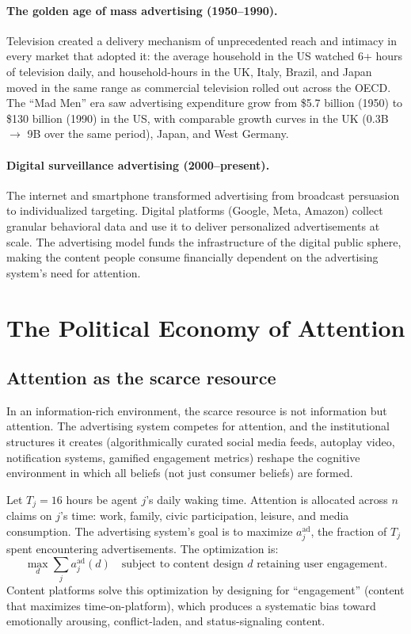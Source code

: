 \paragraph{The golden age of mass advertising (1950--1990).}
Television created a delivery mechanism of unprecedented reach and intimacy in every market that adopted it: the average household in the US watched 6+ hours of television daily, and household-hours in the UK, Italy, Brazil, and Japan moved in the same range as commercial television rolled out across the OECD.
The ``Mad Men'' era saw advertising expenditure grow from \$5.7 billion (1950) to \$130 billion (1990) in the US, with comparable growth curves in the UK (\textsterling 0.3B \(\to\) \textsterling 9B over the same period), Japan, and West Germany.

\paragraph{Digital surveillance advertising (2000--present).}
The internet and smartphone transformed advertising from broadcast persuasion to individualized targeting.
Digital platforms (Google, Meta, Amazon) collect granular behavioral data and use it to deliver personalized advertisements at scale.
The advertising model funds the infrastructure of the digital public sphere, making the content people consume financially dependent on the advertising system's need for attention.

\section{The Political Economy of Attention}
\label{sec:ch23-attention}

\subsection{Attention as the scarce resource}

In an information-rich environment, the scarce resource is not information but attention.
The advertising system competes for attention, and the institutional structures it creates (algorithmically curated social media feeds, autoplay video, notification systems, gamified engagement metrics) reshape the cognitive environment in which all beliefs (not just consumer beliefs) are formed.

\begin{model}
\label{mod:attention}
Let $T_j = 16$ hours be agent $j$'s daily waking time.
Attention is allocated across $n$ claims on $j$'s time: work, family, civic participation, leisure, and media consumption.
The advertising system's goal is to maximize $a_j^{\text{ad}}$, the fraction of $T_j$ spent encountering advertisements.
The optimization is:
\[
  \max_{d} \sum_j a_j^{\text{ad}}(d) \quad \text{subject to content design } d \text{ retaining user engagement.}
\]
Content platforms solve this optimization by designing for ``engagement'' (content that maximizes time-on-platform), which produces a systematic bias toward emotionally arousing, conflict-laden, and status-signaling content.
\end{model}

